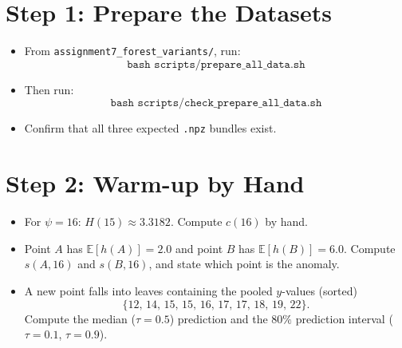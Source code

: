 \section*{Step 1: Prepare the Datasets}
\begin{itemize}
  \item From \texttt{assignment7\_forest\_variants/}, run:
  \[
    \texttt{bash scripts/prepare\_all\_data.sh}
  \]
  \item Then run:
  \[
    \texttt{bash scripts/check\_prepare\_all\_data.sh}
  \]
  \item Confirm that all three expected \texttt{.npz} bundles exist.
\end{itemize}

\section*{Step 2: Warm-up by Hand}
\begin{itemize}
  \item For $\psi=16$: $H(15) \approx 3.3182$. Compute $c(16)$ by hand.
  \item Point $A$ has $\mathbb{E}[h(A)] = 2.0$ and point $B$ has $\mathbb{E}[h(B)] = 6.0$. Compute $s(A,16)$ and $s(B,16)$, and state which point is the anomaly.
  \item A new point falls into leaves containing the pooled $y$-values (sorted)
  \[
    \{12,\,14,\,15,\,15,\,16,\,17,\,17,\,18,\,19,\,22\}.
  \]
  Compute the median ($\tau=0.5$) prediction and the $80\%$ prediction interval ($\tau=0.1$, $\tau=0.9$).
\end{itemize}

